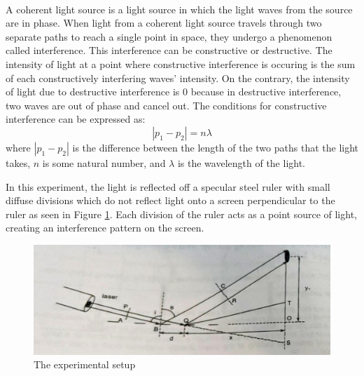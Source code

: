 \documentclass{article}
\begin{document}
\paragraph{}
A coherent light source is a light source in which the light waves from the source are in phase. When light from a coherent light source travels through two separate paths to reach a single point in space, they undergo a phenomenon called interference. This interference can be constructive or destructive. The intensity of light at a point where constructive interference is occuring is the sum of each constructively interfering waves' intensity. On the contrary, the intensity of light due to destructive interference is 0 because in destructive interference, two waves are out of phase and cancel out. The conditions for constructive interference can be expressed as:
\begin{equation}\label{eq:constructive}
  |p_1 - p_2| = n \lambda
\end{equation}
where $|p_1 - p_2|$ is the difference between the length of the two paths that the light takes, $n$ is some natural number, and $\lambda$ is the wavelength of the light.

In this experiment, the light is reflected off a specular steel ruler with small diffuse divisions which do not reflect light onto a screen perpendicular to the ruler as seen in Figure \ref{fig:setup}. Each division of the ruler acts as a point source of light, creating an interference pattern on the screen.
\begin{figure}[H]
  \includegraphics[width=\textwidth]{img/setup.pdf}
  \caption{The experimental setup \autocite{UPCSE2018}}
  \label{fig:setup}
\end{figure}
\end{document}
